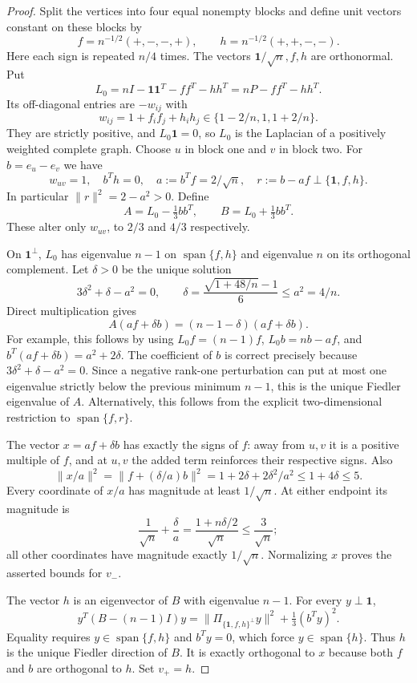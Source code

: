 \documentclass[11pt]{article}
\newcommand{\one}{\boldsymbol 1}
\begin{document}
\begin{proof}
Split the vertices into four equal nonempty blocks and define unit vectors
constant on these blocks by
\[
 f=n^{-1/2}(+,-,-,+),\qquad
 h=n^{-1/2}(+,+,-,-).
\]
Here each sign is repeated $n/4$ times. The vectors $\one/\sqrt n,f,h$
are orthonormal. Put
\[
 L_0=nI-\one\one^T-ff^T-hh^T=nP-ff^T-hh^T.
\]
Its off-diagonal entries are $-w_{ij}$ with
\[
 w_{ij}=1+f_if_j+h_ih_j\in\{1-2/n,1,1+2/n\}.
\]
They are strictly positive, and $L_0\one=0$, so $L_0$ is the
Laplacian of a positively weighted complete graph. Choose $u$ in block
one and $v$ in block two. For $b=e_u-e_v$ we have
\[
 w_{uv}=1,\quad b^Th=0,\quad a:=b^Tf=2/\sqrt n,
 \quad r:=b-af\perp\{\one,f,h\}.
\]
In particular $\|r\|^2=2-a^2>0$. Define
\[
 A=L_0-\tfrac13bb^T,\qquad B=L_0+\tfrac13bb^T.
\]
These alter only $w_{uv}$, to $2/3$ and $4/3$ respectively.

On $\one^\perp$, $L_0$ has eigenvalue $n-1$ on
$\operatorname{span}\{f,h\}$ and eigenvalue $n$ on its orthogonal
complement. Let $\delta>0$ be the unique solution
\[
 3\delta^2+\delta-a^2=0,
 \qquad
 \delta=\frac{\sqrt{1+48/n}-1}{6}\le a^2=4/n.
\]
Direct multiplication gives
\[
 A(af+\delta b)=(n-1-\delta)(af+\delta b).
\]
For example, this follows by using $L_0f=(n-1)f$,
$L_0b=nb-af$, and $b^T(af+\delta b)=a^2+2\delta$.
The coefficient of $b$ is correct precisely because
$3\delta^2+\delta-a^2=0$.
Since a negative rank-one perturbation can put at most one eigenvalue
strictly below the previous minimum $n-1$, this is the unique Fiedler
eigenvalue of $A$. Alternatively, this follows from the explicit
two-dimensional restriction to $\operatorname{span}\{f,r\}$.

The vector $x=af+\delta b$ has exactly the signs of $f$: away from
$u,v$ it is a positive multiple of $f$, and at $u,v$ the added term
reinforces their respective signs. Also
\[
 \|x/a\|^2=\|f+(\delta/a)b\|^2
 =1+2\delta+2\delta^2/a^2
 \le1+4\delta\le5.
\]
Every coordinate of $x/a$ has magnitude at least $1/\sqrt n$.
At either endpoint its magnitude is
\[
 \frac1{\sqrt n}+\frac\delta a
 =\frac{1+n\delta/2}{\sqrt n}\le\frac3{\sqrt n};
\]
all other coordinates have magnitude exactly $1/\sqrt n$.
Normalizing $x$ proves the asserted bounds for $v_-$.

The vector $h$ is an eigenvector of $B$ with eigenvalue $n-1$.
For every $y\perp\one$,
\[
 y^T(B-(n-1)I)y
 =\|\Pi_{\{\one,f,h\}^\perp}y\|^2+\tfrac13(b^Ty)^2.
\]
Equality requires $y\in\operatorname{span}\{f,h\}$ and $b^Ty=0$,
which force $y\in\operatorname{span}\{h\}$. Thus $h$ is the unique
Fiedler direction of $B$. It is exactly orthogonal to $x$ because
both $f$ and $b$ are orthogonal to $h$. Set $v_+=h$.


\end{proof}
\end{document}
